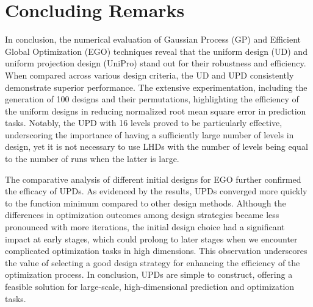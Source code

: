 \documentclass [PhD] {package/uclathes}
\begin{document}
\section{Concluding Remarks}
In conclusion, the numerical evaluation of Gaussian Process (GP) and Efficient Global Optimization (EGO) techniques reveal that the uniform design (UD) and uniform projection  design (UniPro)  stand out for their robustness and efficiency. When compared across various design criteria, the UD and UPD consistently demonstrate superior performance. The extensive experimentation, including the generation of 100 designs and their permutations, highlighting the efficiency of the uniform designs in reducing normalized root mean square error in prediction tasks.
Notably, the UPD with 16 levels proved to be particularly effective, underscoring the importance of having a sufficiently large number of levels in design, yet it is not necessary to use LHDs with the number of levels being equal to the number of runs when the latter is large.

The comparative analysis of different initial designs for EGO further confirmed the efficacy of UPDs. As evidenced by the results, UPDs converged more quickly to the function minimum compared to other design methods. Although the differences in optimization outcomes among design strategies became less pronounced with more iterations, the initial design choice had a significant impact at early stages, which could prolong to later stages when we encounter complicated optimization tasks in high dimensions. This observation underscores the value of selecting a good design strategy for enhancing the efficiency of the optimization process. In conclusion, UPDs are simple to construct, offering a  feasible solution for large-scale, high-dimensional prediction and optimization tasks.
\end{document}

